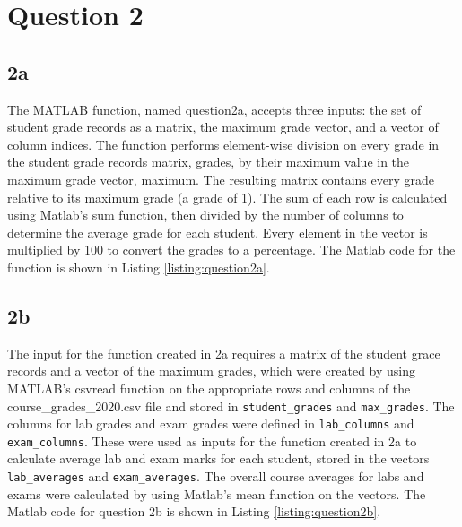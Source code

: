 \documentclass[12pt]{article}
\begin{document}
\section*{Question 2}
\subsection*{2a}
The MATLAB function, named question2a, accepts three inputs: the set of student grade records as a matrix, the maximum grade vector, and a vector of column indices. The function performs element-wise division on every grade in the student grade records matrix, grades, by their maximum value in the maximum grade vector, maximum. The resulting matrix contains every grade relative to its maximum grade (a grade of 1). The sum of each row is calculated using Matlab's sum function, then divided by the number of columns to determine the average grade for each student. Every element in the vector is multiplied by 100 to convert the grades to a percentage. The Matlab code for the function is shown in Listing \ref{listing:question2a}.

\subsection*{2b}
The input for the function created in 2a requires a matrix of the student grace records and a vector of the maximum grades, which were created by using MATLAB's csvread function on the appropriate rows and columns of the course\_grades\_2020.csv file and stored in \verb|student_grades| and \verb|max_grades|. The columns for lab grades and exam grades were defined in \verb|lab_columns| and \verb|exam_columns|. These were used as inputs for the function created in 2a to calculate average lab and exam marks for each student, stored in the vectors \verb|lab_averages| and \verb|exam_averages|. The overall course averages for labs and exams were calculated by using Matlab's mean function on the vectors. The Matlab code for question 2b is shown in Listing \ref{listing:question2b}.

\end{document}
